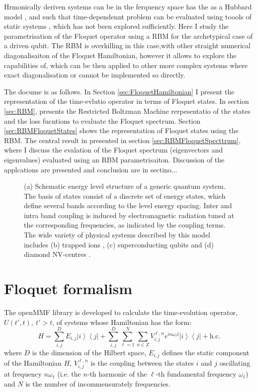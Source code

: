 \documentclass[pra,twocolumn,showkeys,preprintnumbers, amsmath,amssymb, aps,A4paper]{revtex4-1}
\begin{document}
Hrmonically deriven systems can be in the ferquency space has the as a Hubbard model \cite{mine and othres}, and such that time-dependennt problem can be evaluated using toools of static systems \cite{}, which has not been explored sufficiently. Here I study the parametrisation of the Floquet operator using a RBM for the archetypical case of a driven qubit. The RBM is overkilling in this case,with other straight numerical diagonalisaiton of the Floquet Hamiltonian, however it allows to explore the capabilities of, which can be then applied to other more complex systems where exact diagonalisation or cannot be implemented so directly.

The docume is as follows. In Section \ref{sec:FloquetHamiltonian} I present the representation of the time-evlutio operator in terms of Floquet states. In section \ref{sec:RBM}, presents the Restricted Boltzman Machine rerpesentatio of the states and the loss fucntions to evaluate the Floquet spectrum. Section \ref{sec:RBMFloquetStates} shows the representation of Floquet states using the RBM. The central result in presented in section \ref{sec:RBMFloquetSpecttrum}, where I discuss the evalation of the Floquet spectrum (eigenvectors and eigenvalues) evaluated using an RBM parametrisaiton. Discussion of the applcations are presented and conclusion are in sectino...


\begin{figure}
\centering
\caption{\label{fig:SystemSketch} (a) Schematic energy level structure of a generic quantum system. The basis of states consist of a discrete set of energy states, which define several bands according to the level energy spacing. Inter and intra band coupling is induced by electromagnetic radiation tuned at the corresponding frequencies, as indicated by the coupling terms. The wide variety of physical systems described by this model includes (b) trapped ions \cite{PhysRevLett.117.220501}, (c) superconducting qubits \cite{vion2002manipulating} and (d) diamond NV-centres \cite{balasubramanian2009ultralong}.}
\end{figure}


\section{\label{sec:FloquetBloch} Floquet formalism}

The openMMF library is developed to calculate the time-evolution operator, $U(t',t), ~ t'>t$, of systems whose Hamiltonian has the form:
\begin{equation}
H = \sum_{i,j}^D E_{i,j} \left| i\right\rangle \left\langle j \right| + \sum_{i,j}^D \sum_{\ell=1}^N \sum_{n \in Z} V_{i,j}^{\ell,n} e^{i n \omega_\ell t} \left| i\right\rangle \left\langle j \right| + \textrm{h.c.}
\label{eq:Hamiltonian}
\end{equation}
where $D$ is the dimension of the Hilbert space, ${E_{i,j}}$ defines the static component of the Hamiltonian $H$, $V_{i,j}^{\ell,n}$ is the coupling between the states $i$ and $j$ oscillating at frequency $n \omega_{\ell}$ (i.e. the $n$-th harmonic of the $\ell$-th fundamental frequency $\omega_{\ell}$) and $N$ is the number of incommensurately frequencies.
\end{document}
